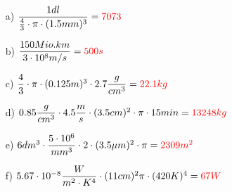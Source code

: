 \documentclass[11pt, a4paper, twoside, fleqn]{article}
\begin{document}
\begin{enumerate}[itemsep=1ex, leftmargin=*]
    \begin{enumerate}[itemsep=2mm]
        \item[a)] $ \dfrac{1dl}{\frac{4}{3} \cdot \pi \cdot (1.5 mm)^{3}} = \textcolor{red}{7073} $
        \item[b)] $ \dfrac{150 Mio. km}{3 \cdot 10^{8} m/s} = \textcolor{red}{500 s} $
        \item[c)] $ \dfrac{4}{3} \cdot \pi \cdot (0.125 m)^{3} \cdot 2.7 \dfrac{g}{cm^{3}} = \textcolor{red}{22.1 kg} $
        \item[d)] $ 0.85 \dfrac{g}{cm^{3}} \cdot 4.5 \dfrac{m}{s} \cdot (3.5 cm)^{2} \cdot \pi \cdot 15 min = \textcolor{red}{13248kg} $
        \item[e)] $ 6 dm^{3} \cdot \dfrac{5 \cdot 10^{6}}{mm^{3}} \cdot 2 \cdot (3.5 \mu m)^{2} \cdot \pi = \textcolor{red}{2309 m^{2}} $ 
        \item[f)] $ 5.67 \cdot 10^{-8} \dfrac{W}{m^{2} \cdot K^{4}} \cdot (11cm)^{2} \pi \cdot (420 K)^{4} = \textcolor{red}{67 W} $
    \end{enumerate}
\end{enumerate}
\end{document}
